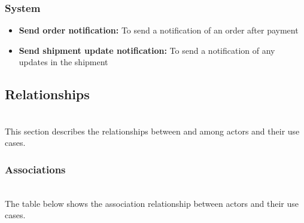 \subsubsection{System}\label{4_WN3yWegXuUNVRZ3nYDG}

\begin{itemize}
\item
\protect{}\label{cLc_CFjzfEL5eQXjk1GYK}
\textbf{Send order notification:} To send a notification of an order after payment
\item
\protect{}\label{gcajmtq9rqxly2aowZst_}
\textbf{Send shipment update notification:} To send a notification of any updates in the shipment
\end{itemize}

\subsection{Relationships}\label{ywwbnxo-pOaTAIkRlrZ9j}
\\
This section describes the relationships between and among actors and their use cases.

\subsubsection{Associations}\label{iloU32EZqnHSB2vofMfB6}
\\
The table below shows the association relationship between actors and their use cases.

\begin{table}[htbp]
\centering
\small
{}
\end{table}

